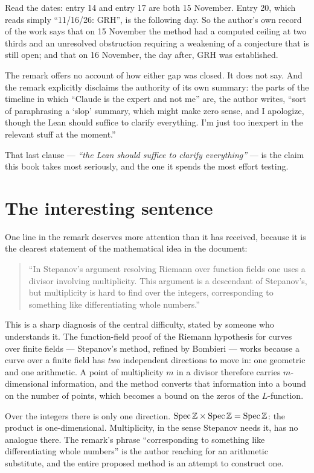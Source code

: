 Read the dates: entry 14 and entry 17 are both 15 November. Entry 20, which
reads simply ``11/16/26: GRH'', is the following day. So the author's own record
of the work says that on 15 November the method had a computed ceiling at two
thirds and an unresolved obstruction requiring a weakening of a conjecture that
is still open; and that on 16 November, the day after, GRH was established.

The remark offers no account of how either gap was closed. It does not say. And
the remark explicitly disclaims the authority of its own summary: the parts of
the timeline in which ``Claude is the expert and not me'' are, the author
writes, ``sort of paraphrasing a `slop' summary, which might make zero sense,
and I apologize, though the Lean should suffice to clarify everything. I'm just
too inexpert in the relevant stuff at the moment.''

That last clause --- \emph{``the Lean should suffice to clarify everything''} ---
is the claim this book takes most seriously, and the one it spends the most
effort testing.

\section{The interesting sentence}One line in the remark deserves more attention than it has received, because it
is the clearest statement of the mathematical idea in the document:

\begin{quote}
\small
``In Stepanov's argument resolving Riemann over function fields one uses a
divisor involving multiplicity. This argument is a descendant of Stepanov's, but
multiplicity is hard to find over the integers, corresponding to something like
differentiating whole numbers.''
\end{quote}

This is a sharp diagnosis of the central difficulty, stated by someone who
understands it. The function-field proof of the Riemann hypothesis for curves
over finite fields --- Stepanov's method, refined by Bombieri --- works because
a curve over a finite field has \emph{two} independent directions to move in:
one geometric and one arithmetic. A point of multiplicity $m$ in a divisor
therefore carries $m$-dimensional information, and the method converts that
information into a bound on the number of points, which becomes a bound on the
zeros of the $L$-function.

Over the integers there is only one direction. $\operatorname{Spec}\mathbb{Z} \times
\operatorname{Spec}\mathbb{Z} = \operatorname{Spec}\mathbb{Z}$: the product is
one-dimensional. Multiplicity, in the sense Stepanov needs it, has no analogue
there. The remark's phrase ``corresponding to something like differentiating
whole numbers'' is the author reaching for an arithmetic substitute, and the
entire proposed method is an attempt to construct one.

